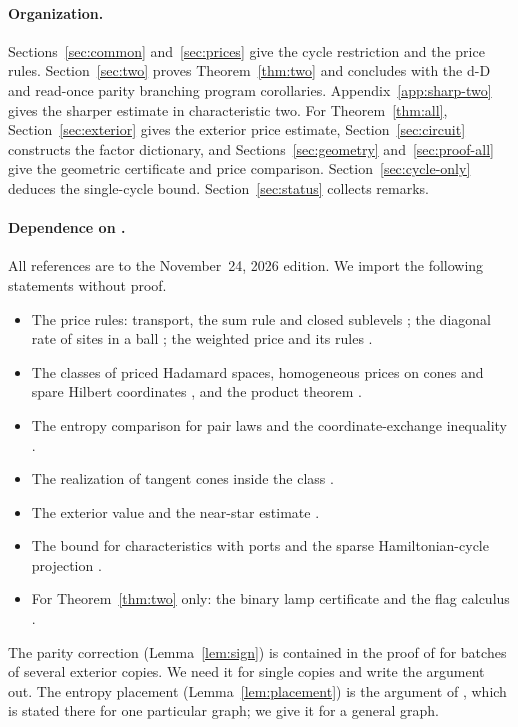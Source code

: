 \documentclass[11pt]{article}
\theoremstyle{remark}
\begin{document}
\paragraph{Organization.}
Sections~\ref{sec:common} and~\ref{sec:prices} give the cycle restriction
and the price rules. Section~\ref{sec:two} proves Theorem~\ref{thm:two}
and concludes with the d-D and read-once parity branching program
corollaries. Appendix~\ref{app:sharp-two} gives the sharper estimate in
characteristic two. For Theorem~\ref{thm:all}, Section~\ref{sec:exterior}
gives the exterior price estimate, Section~\ref{sec:circuit} constructs
the factor dictionary, and Sections~\ref{sec:geometry} and~\ref{sec:proof-all}
give the geometric certificate and price comparison.
Section~\ref{sec:cycle-only} deduces the single-cycle bound.
Section~\ref{sec:status} collects remarks.

\paragraph{Dependence on \cite{hc}.}
All references are to the November~24, 2026 edition. We import the
following statements without proof.
\begin{itemize}
\item The price rules: transport, the sum rule and closed sublevels
\cite[Lemma 2.1]{hc}; the diagonal rate of sites in a ball
\cite[Lemma 2.2]{hc}; the weighted price and its rules
\cite[Equation (11.1) and Lemma 11.1]{hc}.
\item The classes of priced Hadamard spaces, homogeneous prices on cones
and spare Hilbert coordinates \cite[Sections 2.2 and 2.3]{hc}, and the
product theorem \cite[Theorem 6.1]{hc}.
\item The entropy comparison for pair laws \cite[Corollary 5.2]{hc} and
the coordinate-exchange inequality \cite[Equation (7.1)]{hc}.
\item The realization of tangent cones inside the class
\cite[Section 7.4]{hc}.
\item The exterior value and the near-star estimate
\cite[Section 8 and Theorem 8.1]{hc}.
\item The bound for characteristics with ports \cite[Theorem 12.2]{hc}
and the sparse Hamiltonian-cycle projection \cite[Lemma 3.4]{hc}.
\item For Theorem~\ref{thm:two} only: the binary lamp certificate
\cite[Theorem 7.1]{hc} and the flag calculus
\cite[Sections 9 and 10]{hc}.
\end{itemize}
The parity correction (Lemma~\ref{lem:sign}) is contained in the proof of
\cite[Theorem 11.2]{hc} for batches of several exterior copies. We need it
for single copies and write the argument out. The entropy placement
(Lemma~\ref{lem:placement}) is the argument of \cite[Lemma 7.3]{hc},
which is stated there for one particular graph; we give it for a general
graph.
\end{document}
